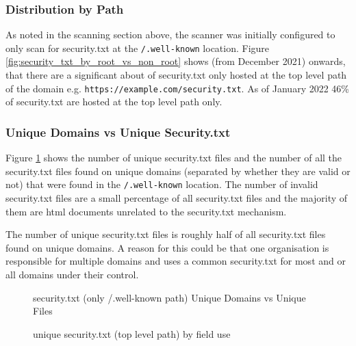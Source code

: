 \documentclass{mscreport}
\begin{document}
\subsubsection{Distribution by Path}

\noindent
As noted in the scanning section above, the scanner was initially configured to only scan for security.txt at the \texttt{/.well-known} location. Figure \ref{fig:security_txt_by_root_vs_non_root} shows (from December 2021) onwards, that there are a significant about of security.txt only hosted at the top level path of the domain e.g. \newline \texttt{https://example.com/security.txt}. As of January 2022 46\% of security.txt are hosted at the top level path only.

\subsubsection{Unique Domains vs Unique Security.txt}

\noindent
Figure \ref{fig:security_txt_unique_vs_domains} shows the number of unique security.txt files and the number of all the security.txt files found on unique domains (separated by whether they are valid or not) that were found in the \texttt{/.well-known} location. The number of invalid security.txt files are a small percentage of all security.txt files and the majority of them are html documents unrelated to the security.txt mechanism.

\newpage

\noindent
The number of unique security.txt files is roughly half of all security.txt files found on unique domains. A reason for this could be that one organisation is responsible for multiple domains and uses a common security.txt for most and or all domains under their control.

\begin{figure}[t]
	\begin{center}
		\caption{security.txt (only /.well-known path) Unique Domains vs Unique Files}
		\label{fig:security_txt_unique_vs_domains}
	\end{center}
\end{figure}


\begin{figure}[t]
	\begin{center}
		\caption{unique security.txt (top level path) by field use}
		\label{fig:security_txt_by_fields_root_only}
	\end{center}
\end{figure}
\end{document}
